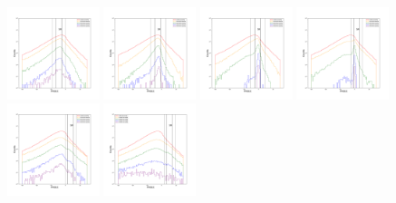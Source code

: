 \documentclass[12pt,prd]{article}
\begin{document}
\begin{figure}[h!]
\includegraphics[width=0.24\textwidth]{../figures/scanning_plotsgaiascan_l22_5_b74_4_ra209_6_dec23_3_npy_10.pdf}
\includegraphics[width=0.24\textwidth]{../figures/scanning_plotsgaiascan_l22_5_b74_4_ra209_6_dec23_3_npy_11.pdf}
\includegraphics[width=0.24\textwidth]{../figures/scanning_plotsgaiascan_l22_5_b74_4_ra209_6_dec23_3_npy_12.pdf}
\includegraphics[width=0.24\textwidth]{../figures/scanning_plotsgaiascan_l22_5_b74_4_ra209_6_dec23_3_npy_13.pdf}
\includegraphics[width=0.24\textwidth]{../figures/scanning_plotsgaiascan_l22_5_b74_4_ra209_6_dec23_3_npy_14.pdf}
\includegraphics[width=0.24\textwidth]{../figures/scanning_plotsgaiascan_l22_5_b74_4_ra209_6_dec23_3_npy_15.pdf}

\end{figure}
\end{document}
